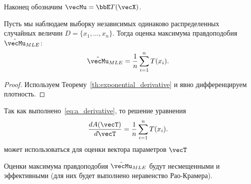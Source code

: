 Наконец обозначим $\vecMu = \bbE T(\vecX)$.
\begin{Theorem}
Пусть мы наблюдаем выборку независимых одинаково распределенных случайных величин $D = \{x_1, \ldots, x_n\}$.
Тогда оценка максимума правдоподобия $\hat{\vecMu}_{MLE}$:
\[
\hat{\vecMu}_{MLE} = \frac{1}{n} \sum_{i = 1}^{n} T(x_i).
\]
\end{Theorem}
\begin{proof}
Используем Теорему~\ref{th:exponential_derivative} и явно дифференцируем плотность.
\end{proof}

Так как выполнено~\eqref{eq:a_derivative}, 
то решение уравнения 
\[
\frac{d A(\vecT)}{d \vecT} = \frac{1}{n} \sum_{i = 1}^{n} T(x_i).
\]
может использоваться для оценки вектора параметров $\vecT$

Оценки максимума правдоподобия $\hat{\vecMu}_{MLE}$ будут несмещенными и эффективными (для них будет выполнено неравенство Рао-Крамера).

